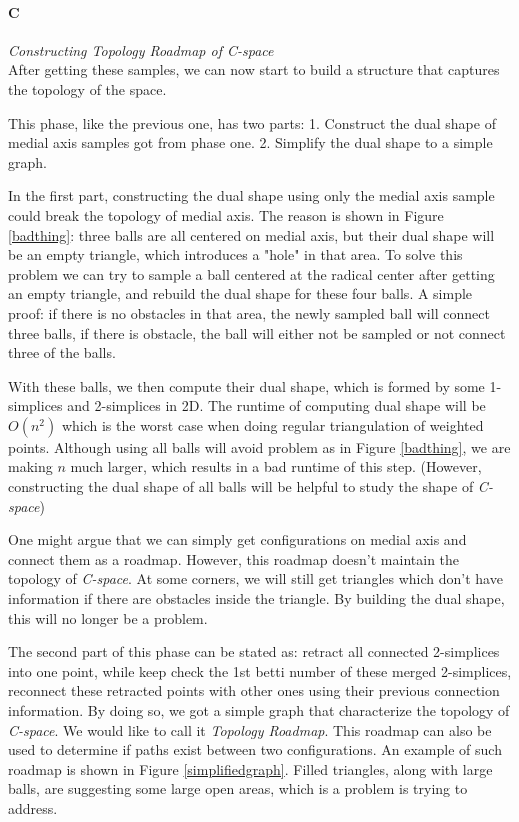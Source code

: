 \documentclass[11pt]{article}
\begin{document}

\paragraph{C} \emph{Constructing Topology Roadmap of C-space} \hfill \\
\indent After getting these samples, we can now start to build a structure that captures the topology of the space. 

\indent This phase, like the previous one, has two parts: 1. Construct the dual shape of medial axis samples got from phase one. 2. Simplify the dual shape to a simple graph.

\indent In the first part, constructing the dual shape using only the medial axis sample could break the topology of medial axis. The reason is shown in Figure \ref{badthing}: three balls are all centered on medial axis, but their dual shape will be an empty triangle, which introduces a "hole" in that area. To solve this problem we can try to sample a ball centered at the radical center after getting an empty triangle, and rebuild the dual shape for these four balls\cite{radical center}. A simple proof: if there is no obstacles in that area, the newly sampled ball will connect three balls, if there is obstacle, the ball will either not be sampled or not connect three of the balls.

\indent With these balls, we then compute their dual shape, which is formed by some 1-simplices and 2-simplices in 2D. The runtime of computing dual shape will be $O(n^2)$ which is the worst case when doing regular triangulation of weighted points. Although using all balls will avoid problem as in Figure \ref{badthing}, we are making $n$ much larger, which results in a bad runtime of this step. (However, constructing the dual shape of all balls will be helpful to study the shape of \emph{C-space})

\indent One might argue that we can simply get configurations on medial axis and connect them as a roadmap. However, this roadmap doesn't maintain the topology of \emph{C-space}. At some corners, we will still get triangles which don't have information if there are obstacles inside the triangle. By building the dual shape, this will no longer be a problem. 

\indent The second part of this phase can be stated as: retract all connected 2-simplices into one point, while keep check the 1st betti number of these merged 2-simplices, reconnect these retracted points with other ones using their previous connection information. By doing so, we got a simple graph that characterize the topology of \emph{C-space}. We would like to call it \emph{Topology Roadmap}. This roadmap can also be used to determine if paths exist between two configurations. An example of such roadmap is shown in Figure \ref{simplifiedgraph}. Filled triangles, along with large balls, are suggesting some large open areas, which is a problem \cite{largeconvex} is trying to address. 
\end{document}

